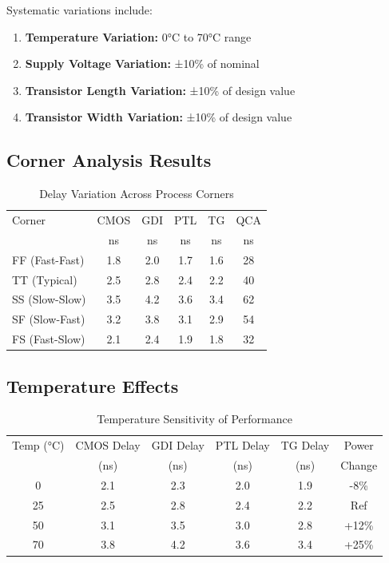 \documentclass[12pt,a4paper,twoside]{report}
\begin{document}
\begin{appendices}
Systematic variations include:

\begin{enumerate}
    \item \textbf{Temperature Variation:} 0°C to 70°C range
    \item \textbf{Supply Voltage Variation:} ±10\% of nominal
    \item \textbf{Transistor Length Variation:} ±10\% of design value
    \item \textbf{Transistor Width Variation:} ±10\% of design value
\end{enumerate}

\subsection{Corner Analysis Results}

\begin{table}[H]
\centering
\caption{Delay Variation Across Process Corners}
\label{tab:corner_analysis}
\begin{tabularx}{\textwidth}{lccccc}
\toprule
Corner & CMOS & GDI & PTL & TG & QCA \\
 & ns & ns & ns & ns & ns \\
\midrule
FF (Fast-Fast) & 1.8 & 2.0 & 1.7 & 1.6 & 28 \\
TT (Typical) & 2.5 & 2.8 & 2.4 & 2.2 & 40 \\
SS (Slow-Slow) & 3.5 & 4.2 & 3.6 & 3.4 & 62 \\
SF (Slow-Fast) & 3.2 & 3.8 & 3.1 & 2.9 & 54 \\
FS (Fast-Slow) & 2.1 & 2.4 & 1.9 & 1.8 & 32 \\
\bottomrule
\end{tabularx}
\end{table}

\subsection{Temperature Effects}

\begin{table}[H]
\centering
\caption{Temperature Sensitivity of Performance}
\label{tab:temp_sensitivity}
\begin{tabularx}{\textwidth}{cccccc}
\toprule
Temp (°C) & CMOS Delay & GDI Delay & PTL Delay & TG Delay & Power \\
 & (ns) & (ns) & (ns) & (ns) & Change \\
\midrule
0 & 2.1 & 2.3 & 2.0 & 1.9 & -8\% \\
25 & 2.5 & 2.8 & 2.4 & 2.2 & Ref \\
50 & 3.1 & 3.5 & 3.0 & 2.8 & +12\% \\
70 & 3.8 & 4.2 & 3.6 & 3.4 & +25\% \\
\bottomrule
\end{tabularx}
\end{table}


\end{appendices}
\end{document}
